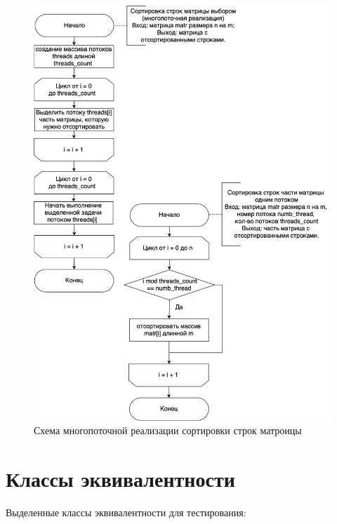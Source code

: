 \documentclass[a4paper,14pt, unknownkeysallowed]{extreport}
\begin{document}
\clearpage

\begin{figure}[h]
	\centering
	\includegraphics[scale=0.6]{img/select_sort_many_threads_scheme.png}
	\caption{Схема многопоточной реализации сортировки строк матроицы}
	\label{fig:select_sort_many_threads}
\end{figure} 

\clearpage

\section{Классы эквивалентности}

Выделенные классы эквивалентности для тестирования:
\end{document}
